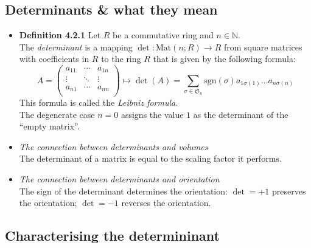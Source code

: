 \documentclass[11pt,a4paper]{article}
\begin{document}
\subsection{Determinants \& what they mean}

\begin{itemize}

    \item \textbf{Definition 4.2.1}
        Let $R$ be a commutative ring and $n \in \mathbb{N}$. \\
        The \emph{determinant} is a mapping
        $\det : \mathrm{Mat}(n;R) \to R$ from square matrices with coefficients in $R$
        to the ring $R$ that is given by the following formula:
        \[
            A =
            \begin{pmatrix}
                a_{11} & \cdots & a_{1n} \\
                \vdots & \ddots & \vdots \\
                a_{n1} & \cdots & a_{nn} \\
            \end{pmatrix}
            \mapsto \det (A) =
            \sum_{\sigma \in \mathfrak{S}_n}
            \mathrm{sgn}(\sigma) a_{1\sigma(1)} \ldots a_{n\sigma(n)}
        \]
        This formula is called the \emph{Leibniz formula}. \\
        The degenerate case $n=0$ assigns the value $1$ as the determinant of the
        ``empty matrix''.

    \item \emph{The connection between determinants and volumes} \\
        The determinant of a matrix is equal to the scaling factor it performs.

    \item \emph{The connection between determinants and orientation} \\
        The sign of the determinant determines the orientation:
        $\det = +1$ preserves the orientation;
        $\det = -1$ reverses the orientation.

\end{itemize}

\subsection{Characterising the determininant}
\end{document}
